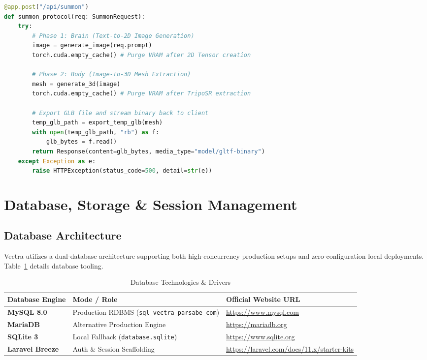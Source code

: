 \documentclass[11pt, a4paper]{article}
\begin{document}
\begin{lstlisting}[language=Python, caption={Sequential VRAM Memory Purging Protocol (main.py)}, label={lst:vram_orchestration}]
@app.post("/api/summon")
def summon_protocol(req: SummonRequest):
    try:
        # Phase 1: Brain (Text-to-2D Image Generation)
        image = generate_image(req.prompt)
        torch.cuda.empty_cache() # Purge VRAM after 2D Tensor creation
        
        # Phase 2: Body (Image-to-3D Mesh Extraction)
        mesh = generate_3d(image)
        torch.cuda.empty_cache() # Purge VRAM after TripoSR extraction
        
        # Export GLB file and stream binary back to client
        temp_glb_path = export_temp_glb(mesh)
        with open(temp_glb_path, "rb") as f:
            glb_bytes = f.read()
        return Response(content=glb_bytes, media_type="model/gltf-binary")
    except Exception as e:
        raise HTTPException(status_code=500, detail=str(e))
\end{lstlisting}


\section{Database, Storage \& Session Management}

\subsection{Database Architecture}
Vectra utilizes a dual-database architecture supporting both high-concurrency production setups and zero-configuration local deployments. Table~\ref{tab:tools_ch6} details database tooling.

\begin{table}[H]
\centering
\caption{Database Technologies \& Drivers}
\label{tab:tools_ch6}
\begin{tabularx}{\textwidth}{l l X}
\toprule
\textbf{Database Engine} & \textbf{Mode / Role} & \textbf{Official Website URL} \\
\midrule
\textbf{MySQL 8.0} & Production RDBMS (\texttt{sql_vectra_parsabe_com}) & \url{https://www.mysql.com} \\
\textbf{MariaDB} & Alternative Production Engine & \url{https://mariadb.org} \\
\textbf{SQLite 3} & Local Fallback (\texttt{database.sqlite}) & \url{https://www.sqlite.org} \\
\textbf{Laravel Breeze} & Auth \& Session Scaffolding & \url{https://laravel.com/docs/11.x/starter-kits} \\
\bottomrule
\end{tabularx}
\end{table}
\end{document}
